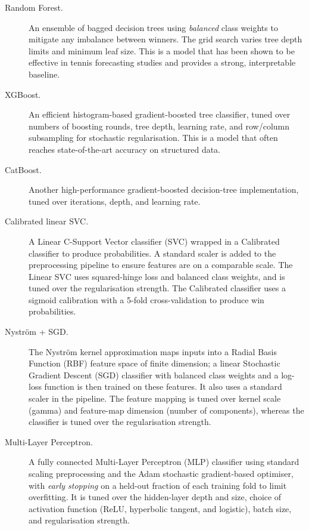 \begin{description}
  \item[Random Forest.] An ensemble of bagged decision trees using \emph{balanced} class weights
    to mitigate any imbalance between winners. The grid search varies tree depth limits and minimum
    leaf size. This is a model that has been shown to be effective in tennis forecasting studies and
    provides a strong, interpretable baseline.

  \item[XGBoost.] An efficient histogram-based gradient-boosted tree classifier, tuned over numbers
    of boosting rounds, tree depth, learning rate, and row/column subsampling for stochastic
    regularisation. This is a model that often reaches state-of-the-art accuracy on structured data.

  \item[CatBoost.] Another high-performance gradient-boosted decision-tree implementation, tuned over
    iterations, depth, and learning rate.

  \item[Calibrated linear SVC.] A Linear C-Support Vector classifier (SVC) wrapped in a Calibrated
    classifier to produce probabilities. A standard scaler is added to the preprocessing pipeline to
    ensure features are on a comparable scale. The Linear SVC uses squared-hinge loss and balanced
    class weights, and is tuned over the regularisation strength. The Calibrated classifier uses a
    sigmoid calibration with a 5-fold cross-validation to produce win probabilities.

  \item[Nyström + SGD.] The Nyström kernel approximation maps inputs into a Radial Basis Function
    (RBF) feature space of finite dimension; a linear Stochastic Gradient Descent (SGD) classifier
    with balanced class weights and a log-loss function
    is then trained on these features. It also uses a standard scaler
    in the pipeline. The feature mapping is tuned over kernel scale (gamma) and feature-map
    dimension (number of components), whereas the classifier is tuned over the
    regularisation strength.

  \item[Multi-Layer Perceptron.] A fully connected Multi-Layer Perceptron (MLP) classifier using
    standard scaling preprocessing and the Adam stochastic gradient-based optimiser, with
    \emph{early stopping} on a held-out fraction of each training fold to limit overfitting. It is
    tuned over the hidden-layer depth and size, choice of activation function (ReLU, hyperbolic
    tangent, and logistic), batch size, and regularisation strength.

\end{description}

